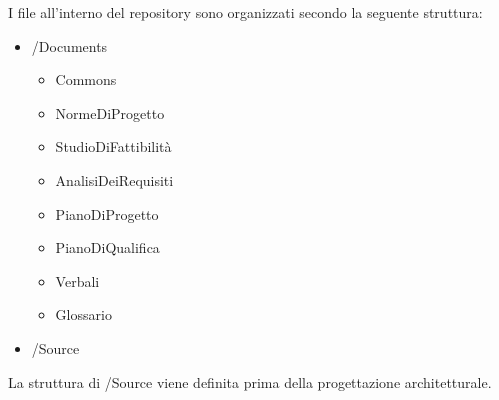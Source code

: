 				I file all’interno del repository sono organizzati secondo la seguente struttura:
				\begin{itemize}
					\item /Documents
					\begin{itemize}
						\item Commons
						\item NormeDiProgetto
						\item StudioDiFattibilità
						\item AnalisiDeiRequisiti
						\item PianoDiProgetto
						\item PianoDiQualifica
						\item Verbali
						\item Glossario
					\end{itemize}
					\item /Source
				\end{itemize}
				La struttura di /Source viene definita prima della progettazione architetturale.

